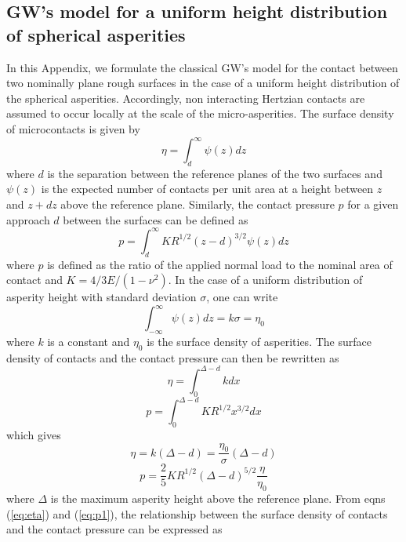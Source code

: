 \documentclass[pre,groupedaddress,showkeys,showpacs,twocolumn]{revtex4}
\begin{document}
\subsection{GW's model for a uniform height distribution of spherical asperities}
In this Appendix, we formulate the classical GW's model for the contact between two nominally plane rough surfaces in the case of a uniform height distribution of the spherical asperities. Accordingly, non interacting Hertzian contacts are assumed to occur locally at the scale of the micro-asperities. The surface density of microcontacts is given by
%
\begin{equation}
	\eta=\int_d^\infty \psi(z)dz
\end{equation}
%
where $d$ is the separation between the reference planes of the two surfaces and $\psi(z)$ is the expected number of contacts per unit area at a height between $z$ and $z+dz$ above the reference plane. Similarly, the contact pressure $p$ for a given approach $d$ between the surfaces can be defined as
%
\begin{equation}
	p=\int_d^\infty KR^{1/2}\left(z-d \right )^{3/2}\psi \left(z\right)dz
\end{equation}
%
where $p$ is defined as the ratio of the applied normal load to the nominal area of contact and $K=4/3 E/(1-\nu^2)$. In the case of a uniform distribution of asperity height with standard deviation $\sigma$, one can write
%
\begin{equation}
	\int_{-\infty}^\infty \psi(z)dz=k \sigma = \eta_0
\end{equation}
%
where $k$ is a constant and $\eta_0$ is the surface density of asperities. The surface density of contacts and the contact pressure can then be rewritten as
%
\begin{equation}
	\eta=\int_0^{\Delta-d} kdx
\end{equation}
\begin{equation}
	p=\int_0^{\Delta-d} KR^{1/2}x^{3/2} dx
\end{equation}
%
which gives
%
\begin{equation}
	\eta=k\left( \Delta-d \right)=\frac{\eta_0}{\sigma}\left(  \Delta-d \right)
	\label{eq:eta}
\end{equation}
\begin{equation}
	p=\frac{2}{5} KR^{1/2}\left( \Delta-d \right)^{5/2} \frac{\eta}{\eta_0}
	\label{eq:p1}
\end{equation}
%
where $\Delta$ is the maximum asperity height above the reference plane. From eqns (\ref{eq:eta}) and (\ref{eq:p1}), the relationship between the surface density of contacts and the contact pressure can be expressed as
\end{document}

